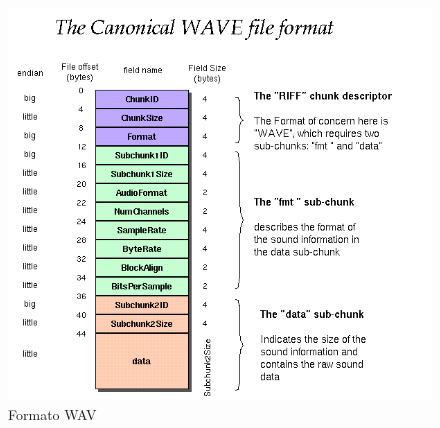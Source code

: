 \documentclass[12pt]{article}
\begin{document}
\begin{figure}
  \centering
    \includegraphics[width=\textwidth]{img/wavsoundformat}
  \caption{Formato WAV}
  \label{wavsoundformat}
\end{figure}
\end{document}

